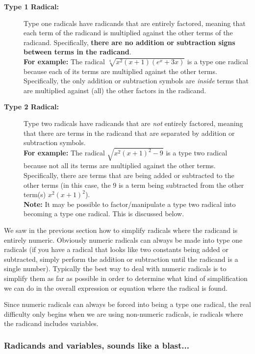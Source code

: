     \begin{description}
    \item[\textbf{Type 1 Radical:}] Type one radicals have radicands that are entirely factored, meaning that each term of the radicand is multiplied against the other terms of the radicand. Specifically, \textbf{there are no addition or subtraction signs between terms in the radicand}.\\
    \textbf{For example:} The radical $\sqrt[4]{x^2(x+1)(e^x + 3x)}$ is a type one radical because each of its terms are multiplied against the other terms. Specifically, the only addition or subtraction symbols are \textit{inside} terms that are multiplied against (all) the other factors in the radicand.
    \item[\textbf{Type 2 Radical:}] Type two radicals have radicands that are \textit{not} entirely factored, meaning that there are terms in the radicand that are separated by addition or subtraction symbols.\\
    \textbf{For example:} The radical $\sqrt{x^2(x+1)^2 - 9}$ is a type two radical because not all its terms are multiplied against the other terms. Specifically, there are terms that are being added or subtracted to the other terms (in this case, the $9$ is a term being subtracted from the other term(s) $x^2(x+1)^2$).\\
    \textbf{Note:} It may be possible to factor/manipulate a type two radical into becoming a type one radical. This is discussed below.
    \end{description}


    We saw in the previous section how to simplify radicals where the radicand is entirely numeric. Obviously numeric radicals can always be made into type one radicals (if you have a radical that looks like two constants being added or subtracted, simply perform the addition or subtraction until the radicand is a single number). Typically the best way to deal with numeric radicals is to simplify them as far as possible in order to determine what kind of simplification we can do in the overall expression or equation where the radical is found.

    Since numeric radicals can always be forced into being a type one radical, the real difficulty only begins when we are using non-numeric radicals, ie radicals where the radicand includes variables.

    \subsubsection*{Radicands and variables, sounds like a blast...}

